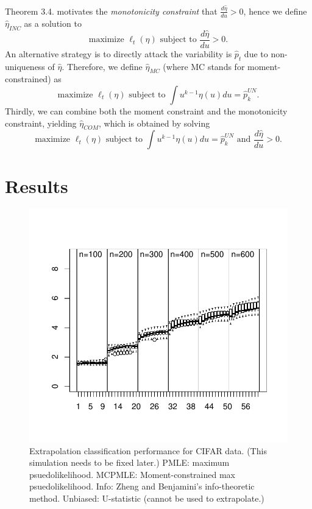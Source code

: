 \documentclass{article}
\begin{document}
Theorem 3.4. motivates the \emph{monotonicity constraint} that $\frac{d\hat{\eta}}{du} > 0$,
hence we define $\hat{\eta}_{INC}$ as a solution to
\[
\text{maximize }\ell_t(\eta) \text{ subject to }\frac{d\hat{\eta}}{du} > 0.
\]
An alternative strategy is to directly attack the variability is $\hat{p}_t$ due to non-uniqueness of $\hat{\eta}$.
Therefore, we define $\hat{\eta}_{MC}$ (where MC stands for moment-constrained)
as
\[
\text{maximize }\ell_t(\eta) \text{ subject to }\int u^{k-1} \eta(u) du = \hat{p}_k^{UN}.
\]
Thirdly, we can combine both the moment constraint and the monotonicity constraint, yielding
$\hat{\eta}_{COM}$, which is obtained by solving
\[
\text{maximize }\ell_t(\eta) \text{ subject to }\int u^{k-1} \eta(u) du = \hat{p}_k^{UN}\text{ and }\frac{d\hat{\eta}}{du} > 0.
\]




\section{Results}

\begin{figure}
\centering
\includegraphics[scale = 0.6]{gabor_random_Y.pdf}
\caption{Extrapolation classification performance for CIFAR data.  (This simulation needs to be fixed later.)
PMLE: maximum psuedolikelihood. MCPMLE: Moment-constrained max psuedolikelihood.  Info: Zheng and Benjamini's info-theoretic method.
Unbiased: U-statistic (cannot be used to extrapolate.) }
\end{figure}
\end{document}
